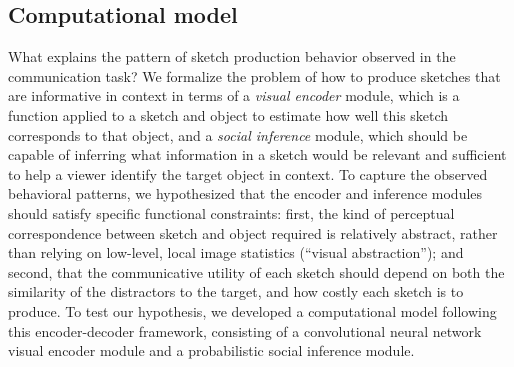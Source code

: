 \documentclass[9pt,twocolumn,twoside]{pnas-new}
\newcommand{\mwu}[1]{{\color{green}{[mwu: #1]}}}
\begin{document}





\subsection*{Computational model}

What explains the pattern of sketch production behavior observed in the communication task? We formalize the problem of how to produce sketches that are informative in context in terms of a \textit{visual encoder} module, which is a function applied to a sketch and object to estimate how well this sketch corresponds to that object, and a \textit{social inference} module, which should be capable of inferring what information in a sketch would be relevant and sufficient to help a viewer identify the target object in context.
To capture the observed behavioral patterns, we hypothesized that the encoder and inference modules should satisfy specific functional constraints: first, the kind of perceptual correspondence between sketch and object required is relatively abstract, rather than relying on low-level, local image statistics (``visual abstraction''); and second, that the communicative utility of each sketch should depend on both the similarity of the distractors to the target, and how costly each sketch is to produce. 
To test our hypothesis, we developed a computational model following this encoder-decoder framework, consisting of a convolutional neural network visual encoder module and a probabilistic social inference module.
\end{document}
